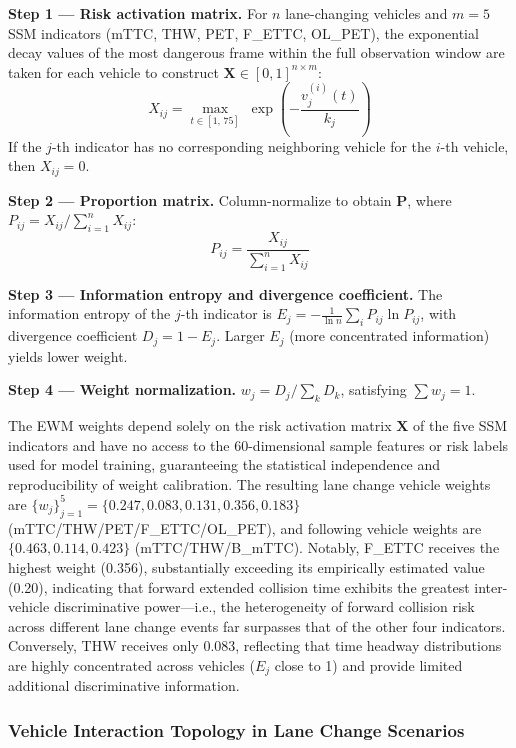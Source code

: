 \documentclass[preprint,review,12pt,a4paper]{elsarticle}
\begin{document}
\textbf{Step 1 --- Risk activation matrix.} For $n$ lane-changing vehicles and $m = 5$ SSM indicators (mTTC, THW, PET, F\_ETTC, OL\_PET), the exponential decay values of the most dangerous frame within the full observation window are taken for each vehicle to construct $\mathbf{X} \in [0,1]^{n \times m}$:
\begin{equation}
X_{ij} = \max_{t \in [1,\,75]}\; \exp\!\left(-\frac{v_j^{(i)}(t)}{k_j}\right)
\end{equation}
If the $j$-th indicator has no corresponding neighboring vehicle for the $i$-th vehicle, then $X_{ij} = 0$.

\textbf{Step 2 --- Proportion matrix.} Column-normalize to obtain $\mathbf{P}$, where $P_{ij} = X_{ij} / \sum_{i=1}^n X_{ij}$:
\begin{equation}
P_{ij} = \frac{X_{ij}}{\sum_{i=1}^{n} X_{ij}}
\end{equation}

\textbf{Step 3 --- Information entropy and divergence coefficient.} The information entropy of the $j$-th indicator is $E_j = -\frac{1}{\ln n}\sum_i P_{ij}\ln P_{ij}$, with divergence coefficient $D_j = 1 - E_j$. Larger $E_j$ (more concentrated information) yields lower weight.

\textbf{Step 4 --- Weight normalization.} $w_j = D_j / \sum_k D_k$, satisfying $\sum w_j = 1$.

The EWM weights depend solely on the risk activation matrix $\mathbf{X}$ of the five SSM indicators and have no access to the 60-dimensional sample features or risk labels used for model training, guaranteeing the statistical independence and reproducibility of weight calibration. The resulting lane change vehicle weights are $\{w_j\}^{5}_{j=1} = \{0.247, 0.083, 0.131, 0.356, 0.183\}$ (mTTC/THW/PET/F\_ETTC/OL\_PET), and following vehicle weights are $\{0.463, 0.114, 0.423\}$ (mTTC/THW/B\_mTTC). Notably, F\_ETTC receives the highest weight (0.356), substantially exceeding its empirically estimated value (0.20), indicating that forward extended collision time exhibits the greatest inter-vehicle discriminative power---i.e., the heterogeneity of forward collision risk across different lane change events far surpasses that of the other four indicators. Conversely, THW receives only 0.083, reflecting that time headway distributions are highly concentrated across vehicles ($E_j$ close to 1) and provide limited additional discriminative information.

\subsubsection{Vehicle Interaction Topology in Lane Change Scenarios}
\end{document}
